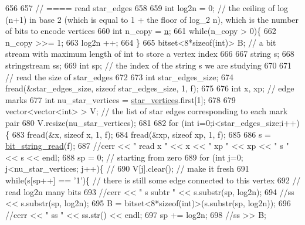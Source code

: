 \begin{DoxyCode}
656 
657   \textcolor{comment}{// ==== read star\_edges}
658 
659   \textcolor{keywordtype}{int} log2n = 0; \textcolor{comment}{// the ceiling of log (n+1) in base 2 (which is equal to 1 + the floor of log\_2 n), which
       is the number of bits to encode vertices}
660   \textcolor{keywordtype}{int} n\_copy = \hyperlink{classmarked__graph__compressed_a8d841016ddb11cfd33748c8deb6277ba}{n};
661   \textcolor{keywordflow}{while}(n\_copy > 0)\{
662     n\_copy >>= 1;
663     log2n ++;
664   \}
665   bitset<8*sizeof(int)> B; \textcolor{comment}{// a bit stream with maximum length of int to store a vertex index}
666 
667   \textcolor{keywordtype}{string} s;
668   stringstream ss;
669   \textcolor{keywordtype}{int} sp; \textcolor{comment}{// the index of the string s we are studying }
670 
671   \textcolor{comment}{// read the size of star\_edges}
672 
673   \textcolor{keywordtype}{int} star\_edges\_size;
674   fread(&star\_edges\_size, \textcolor{keyword}{sizeof} star\_edges\_size, 1, f);
675 
676   \textcolor{keywordtype}{int} x, xp; \textcolor{comment}{// edge marks}
677   \textcolor{keywordtype}{int} nu\_star\_vertices = \hyperlink{classmarked__graph__compressed_a7a4ced4586e2e353f9076bd447df5208}{star\_vertices}.first[1];
678 
679   vector<vector<int> > V; \textcolor{comment}{// the list of star edges corresponding to each mark pair}
680   V.resize(nu\_star\_vertices);
681 
682   \textcolor{keywordflow}{for} (\textcolor{keywordtype}{int} i=0;i<star\_edges\_size;i++)\{
683     fread(&x, \textcolor{keyword}{sizeof} x, 1, f);
684     fread(&xp, \textcolor{keyword}{sizeof} xp, 1, f);
685   
686     s = \hyperlink{compression__helper_8cpp_a40e8dcbc036f96b28e003e882c4890b7}{bit\_string\_read}(f);
687     \textcolor{comment}{//cerr << " read  x " << x << " xp " << xp << " s " << s << endl;}
688     sp = 0; \textcolor{comment}{// starting from zero }
689     \textcolor{keywordflow}{for} (\textcolor{keywordtype}{int} j=0; j<nu\_star\_vertices; j++)\{ \textcolor{comment}{// }
690       V[j].clear(); \textcolor{comment}{// make it fresh}
691       \textcolor{keywordflow}{while}(s[sp++] == \textcolor{charliteral}{'1'})\{ \textcolor{comment}{// there is still some edge connected to this vertex }
692         \textcolor{comment}{// read log2n many bits}
693         \textcolor{comment}{//cerr << " s subtr " << s.substr(sp, log2n);}
694         \textcolor{comment}{//ss << s.substr(sp, log2n);}
695         B = bitset<8*sizeof(int)>(s.substr(sp, log2n));
696         \textcolor{comment}{//cerr << " ss " << ss.str() << endl;}
697         sp += log2n;
698         \textcolor{comment}{//ss >> B;}

\end{DoxyCode}
